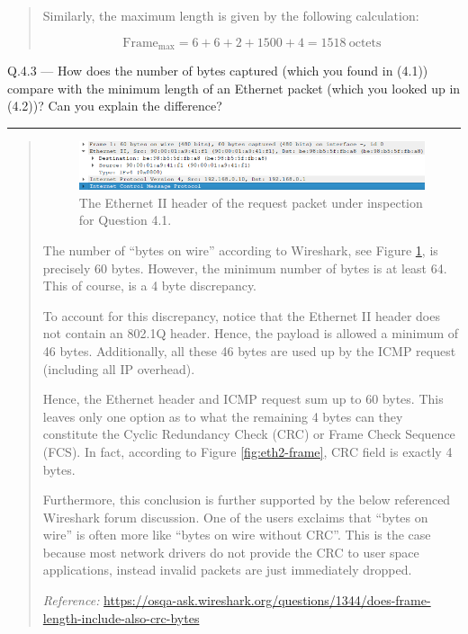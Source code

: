 \documentclass{article}
\newcommand\Que[2]{%
   \begin{samepage}
   \leavevmode\par
   \noindent
   Q.#1 --- #2\par\vspace{10pt}\hrule\vspace{10pt}
   \end{samepage}}
\newenvironment{ans}
   {\fbox{Answer}\begin{quote}\nopagebreak}
   {\end{quote}}
\newcommand\Refer[1]{
   \begin{center}
      {\small\textit{Reference:} \url{#1}}
   \end{center}
}%
\begin{document}
\begin{ans}
Similarly, the maximum length is given by the following
calculation:

$$
{\text{Frame}}_{\text{max}} = 6 + 6 + 2 + 1500 + 4 = 1518\ \text{octets}
$$
\end{ans}

\Que{4.3}{How does the number of bytes captured (which you found
in (4.1)) compare with the minimum length of an Ethernet packet
(which you looked up in (4.2))? Can you explain the difference?}

\begin{ans}

\begin{figure}[H]
   \centering
   \includegraphics[width=14cm]{data/q4.3-ethernet-header.png}
   \caption{The Ethernet II header of the request packet under
   inspection for Question 4.1.}
   \label{fig:eth2-header-for-q4.3}
\end{figure}

The number of ``bytes on wire'' according to Wireshark, see
Figure \ref{fig:eth2-header-for-q4.3}, is precisely 60 bytes.
However, the minimum number of bytes is at least 64. This of
course, is a 4 byte discrepancy. 

To account for this discrepancy, notice that the Ethernet II
header does not contain an 802.1Q header. Hence, the payload is
allowed a minimum of 46 bytes. Additionally, all these 46 bytes
are used up by the ICMP request (including all IP overhead).

Hence, the Ethernet header and ICMP request sum up to 60 bytes.
This leaves only one option as to what the remaining 4 bytes can
they constitute the Cyclic Redundancy Check (CRC) or Frame Check
Sequence (FCS). In fact, according to Figure
\ref{fig:eth2-frame}, CRC field is exactly 4 bytes.

Furthermore, this conclusion is further supported by the below
referenced Wireshark forum discussion. One of the users exclaims
that ``bytes on wire'' is often more like ``bytes on wire
without CRC''. This is the case because most network drivers do
not provide the CRC to user space applications, instead invalid
packets are just immediately dropped.

\Refer{https://osqa-ask.wireshark.org/questions/1344/does-frame-length-include-also-crc-bytes}
\end{ans}
\end{document}
